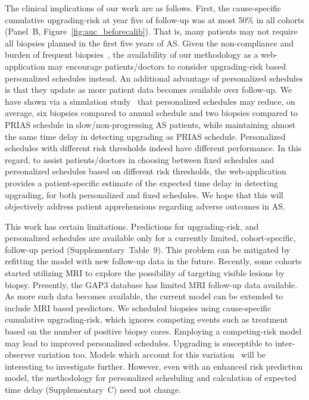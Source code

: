 The clinical implications of our work are as follows. First, the cause-specific cumulative upgrading-risk at year five of follow-up was at most 50\% in all cohorts (Panel~B, Figure~\ref{fig:auc_beforecalib}). That is, many patients may not require all biopsies planned in the first five years of AS. Given the non-compliance and burden of frequent biopsies~\citep{bokhorst2015compliance}, the availability of our methodology as a web-application may encourage patients/doctors to consider upgrading-risk based personalized schedules instead. An additional advantage of personalized schedules is that they update as more patient data becomes available over follow-up. We have shown via a simulation study~\citep{tomer2019personalized} that personalized schedules may reduce, on average, six biopsies compared to annual schedule and two biopsies compared to PRIAS schedule in slow/non-progressing AS patients, while maintaining almost the same time delay in detecting upgrading as PRIAS schedule. Personalized schedules with different risk thresholds indeed have different performance. In this regard, to assist patients/doctors in choosing between fixed schedules and personalized schedules based on different risk thresholds, the web-application provides a patient-specific estimate of the expected time delay in detecting upgrading, for both personalized and fixed schedules. We hope that this will objectively address patient apprehensions regarding adverse outcomes in AS.

This work has certain limitations. Predictions for upgrading-risk, and personalized schedules are available only for a currently limited, cohort-specific, follow-up period (Supplementary~Table~9). This problem can be mitigated by refitting the model with new follow-up data in the future. Recently, some cohorts started utilizing MRI to explore the possibility of targeting visible lesions by biopsy. Presently, the GAP3 database has limited MRI follow-up data available. As more such data becomes available, the current model can be extended to include MRI based predictors. We scheduled biopsies using cause-specific cumulative upgrading-risk, which ignores competing events such as treatment based on the number of positive biopsy cores. Employing a competing-risk model may lead to improved personalized schedules. Upgrading is susceptible to inter-observer variation too. Models which account for this variation~\citep{coley2017prediction,balasubramanian2003estimation} will be interesting to investigate further. However, even with an enhanced risk prediction model, the methodology for personalized scheduling and calculation of expected time delay (Supplementary~C) need not change.